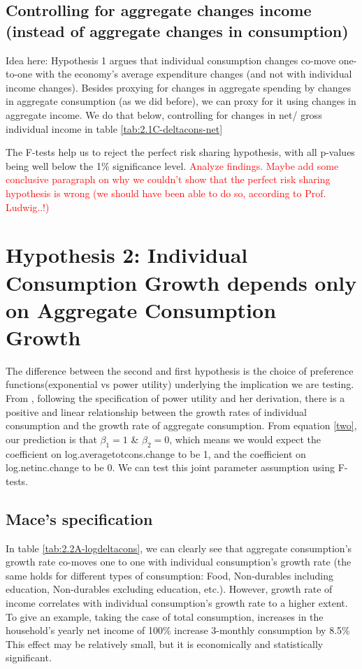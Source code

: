 \documentclass[12pt,a4paper]{article}
\begin{document}


\subsection*{Controlling for aggregate changes income (instead of aggregate changes in consumption)}

Idea here: Hypothesis 1 argues that individual consumption changes co-move one-to-one with the economy's average expenditure changes (and not with individual income changes). Besides proxying for changes in aggregate spending by changes in aggregate consumption (as we did before), we can proxy for it using changes in aggregate income. We do that below, controlling for changes in net/ gross individual income in table \ref{tab:2.1C-deltacons-net}



The F-tests help us to reject the perfect risk sharing hypothesis, with all p-values being well below the 1\% significance level. 
\textcolor{red}{Analyze findings. Maybe add some conclusive paragraph on why we couldn't show that the perfect risk sharing hypothesis is wrong (we should have been able to do so, according to Prof. Ludwig..!)}

\section*{Hypothesis 2: Individual Consumption Growth depends only on Aggregate Consumption Growth}
The difference between the second and first hypothesis is the choice of preference functions(exponential vs power utility) underlying the implication we are testing. From \citealp{mace1991}, following the specification of power utility and her derivation, there is a positive and linear relationship between the growth rates of individual consumption and the growth rate of aggregate consumption. From equation \eqref{two}, our prediction is that $\beta_1=1$ \& $\beta_2=0$, which means we would expect the coefficient on log.averagetotcons.change to be 1, and the coefficient on log.netinc.change to be 0. We can test this joint parameter assumption using F-tests.

\subsection*{Mace's specification}

In table \ref{tab:2.2A-logdeltacons}, we can clearly see that aggregate consumption's growth rate co-moves one to one with individual consumption's growth rate (the same holds for different types of consumption: Food, Non-durables including education, Non-durables excluding education, etc.). However,  growth rate of income correlates with individual consumption's growth rate to a higher extent. To give an example, taking the case of total consumption, increases in the household's yearly net income of 100\% increase 3-monthly consumption by 8.5\% This effect may be relatively small, but it is economically and statistically significant.  \\
\end{document}

